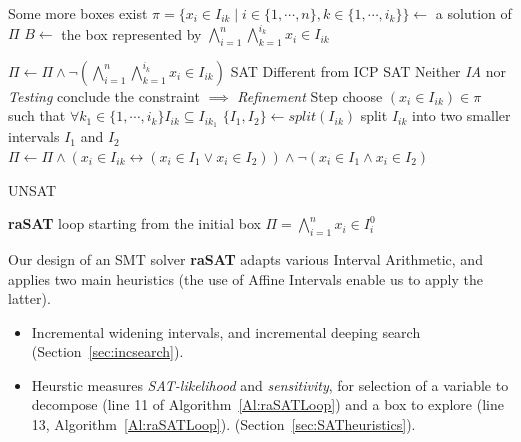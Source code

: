 \documentclass[runningheads,a4paper,oribibl]{llncs}
\begin{document}
\begin{algorithm}
\begin{algorithmic}[1]
 \Comment Some more boxes exist
\State $\pi = \{x_i \in I_{ik} \mid i \in \{1,\cdots, n\}, k \in \{1,\cdots, i_k\} \} \gets $
a solution of $\Pi$ 	
\State $B \gets $ the box represented by
$\bigwedge\limits_{i=1}^n\bigwedge\limits_{k=1}^{i_k}x_i \in I_{ik}$

\State $\Pi \gets \Pi \wedge \neg(\bigwedge\limits_{i=1}^n\bigwedge\limits_{k=1}^{i_k}x_i \in I_{ik})$
\State \Return SAT
   \Comment Different from ICP
\State \Return SAT
\Else \Comment Neither \emph{IA} nor \emph{Testing} conclude the constraint $\implies$
\emph{Refinement} Step
\State choose $(x_i \in I_{ik}) \in \pi$ such that $\forall k_1 \in \{1,\cdots, i_k\} I_{ik} \subseteq I_{ik_1}$
\State $\{I_1, I_2\} \gets split(I_{ik})$ \Comment split $I_{ik}$
into two smaller intervals $I_1$ and $I_2$
\State $\Pi \gets \Pi \wedge (x_i \in I_{ik} \leftrightarrow (x_i \in I_1 \vee x_i \in I_2))
\wedge \neg(x_i \in I_1 \wedge x_i \in I_2)$

\EndIf
\EndWhile
\State \Return UNSAT
\end{algorithmic}
\caption{\textbf{raSAT} loop starting from the initial box
  $\Pi = \bigwedge\limits_{i=1}^n x_i \in I_i^0$}
\label{Al:raSATLoop}
\end{algorithm}

Our design of an SMT solver {\bf raSAT} adapts various Interval Arithmetic,
and applies two main heuristics (the use of Affine Intervals enable us to apply the latter).
\begin{itemize}
\item Incremental widening intervals, and incremental deeping search 
(Section~\ref{sec:incsearch}). 
\item 
Heurstic measures {\em SAT-likelihood} and {\em sensitivity}, 
for selection of a variable to decompose (line 11 of Algorithm~\ref{Al:raSATLoop}) and
a box to explore (line 13, Algorithm~\ref{Al:raSATLoop}). (Section~\ref{sec:SATheuristics}). 
\end{itemize} 

\end{document}
